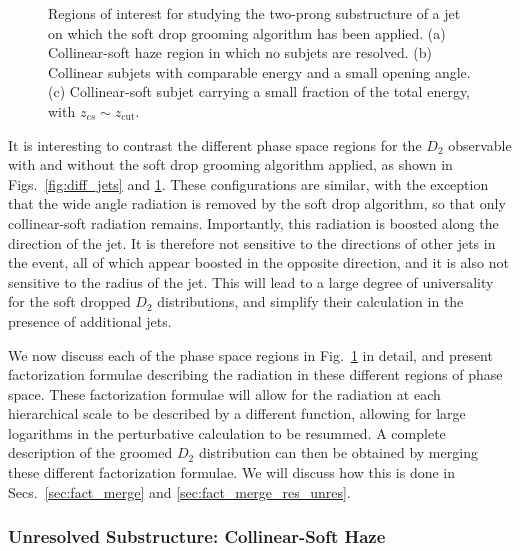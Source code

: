 \documentclass[a4paper,11pt]{article}
\def\zcut{z_{\text{cut}}}
\DeclareRobustCommand{\Secs}[2]{Secs.~\ref{#1} and \ref{#2}}
\DeclareRobustCommand{\Fig}[1]{Fig.~\ref{#1}}
\DeclareRobustCommand{\Figs}[2]{Figs.~\ref{#1} and \ref{#2}}
\begin{document}
\begin{figure}
\begin{center}
\end{center}
\caption{Regions of interest for studying the two-prong substructure of a jet on which the soft drop grooming algorithm has been applied. (a) Collinear-soft haze region in which no subjets are resolved. (b) Collinear subjets with comparable energy and a small opening angle. (c) Collinear-soft subjet carrying a small fraction of the total energy, with $z_{cs} \sim \zcut$. 
}
\label{fig:subjets_summary}
\end{figure}

It is interesting to contrast the different phase space regions for the $D_2$ observable with and without the soft drop grooming algorithm applied, as shown in \Figs{fig:diff_jets}{fig:subjets_summary}. These configurations are similar, with the exception that the wide angle radiation is removed by the soft drop algorithm, so that only collinear-soft radiation remains. Importantly, this radiation is boosted along the direction of the jet. It is therefore not sensitive to the directions of other jets in the event, all of which appear boosted in the opposite direction, and it is also not sensitive to the radius of the jet. This will lead to a large degree of universality for the soft dropped $D_2$ distributions, and simplify their calculation in the presence of additional jets.

We now discuss each of the phase space regions in \Fig{fig:subjets_summary} in detail, and present factorization formulae describing the radiation in these different regions of phase space. These factorization formulae will allow for the radiation at each hierarchical scale to be described by a different function, allowing for large logarithms in the perturbative calculation to be resummed. A complete description of the groomed $D_2$ distribution can then be obtained by merging these different factorization formulae. We will discuss how this is done in \Secs{sec:fact_merge}{sec:fact_merge_res_unres}.



\subsubsection{Unresolved Substructure: Collinear-Soft Haze}\label{sec:fact_un}
\end{document}
